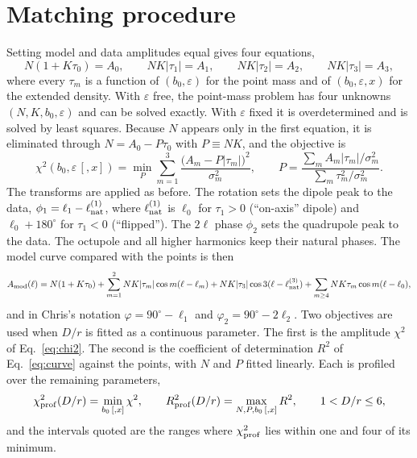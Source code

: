 \documentclass[10pt]{article}
\begin{document}
\section{Matching procedure}
Setting model and data amplitudes equal gives four equations,
\begin{equation}
N(1+K\tau_0)=A_0,\qquad NK|\tau_1|=A_1,\qquad NK|\tau_2|=A_2,\qquad NK|\tau_3|=A_3,
\label{eq:match}
\end{equation}
where every $\tau_m$ is a function of $(b_0,\varepsilon)$ for the point mass and of $(b_0,\varepsilon,x)$ for the extended density. With $\varepsilon$ free, the point-mass problem has four unknowns $(N,K,b_0,\varepsilon)$ and can be solved exactly. With $\varepsilon$ fixed it is overdetermined and is solved by least squares. Because $N$ appears only in the first equation, it is eliminated through $N=A_0-P\tau_0$ with $P\equiv NK$, and the objective is
\begin{equation}
\chi^2(b_0,\varepsilon\,[,x])=\min_P\sum_{m=1}^{3}\frac{\big(A_m-P|\tau_m|\big)^2}{\sigma_m^2},\qquad
P=\frac{\sum_m A_m|\tau_m|/\sigma_m^2}{\sum_m\tau_m^2/\sigma_m^2}.
\label{eq:chi2}
\end{equation}
The transforms are applied as before. The rotation sets the dipole peak to the data, $\phi_1=\ell_1-\ell^{(1)}_{\rm nat}$, where $\ell^{(1)}_{\rm nat}$ is $\ell_0$ for $\tau_1>0$ (``on-axis'' dipole) and $\ell_0+180^\circ$ for $\tau_1<0$ (``flipped''). The $2\ell$ phase $\phi_2$ sets the quadrupole peak to the data. The octupole and all higher harmonics keep their natural phases. The model curve compared with the points is then
\begin{equation}
A_{\rm mod}(\ell)=N(1+K\tau_0)+\sum_{m=1}^{2}NK|\tau_m|\cos m(\ell-\ell_m)+NK|\tau_3|\cos 3(\ell-\ell^{(3)}_{\rm nat})+\sum_{m\ge4}NK\tau_m\cos m(\ell-\ell_0),
\label{eq:curve}
\end{equation}
and in Chris's notation $\varphi=90^\circ-\ell_1$ and $\varphi_2=90^\circ-2\ell_2$. Two objectives are used when $D/r$ is fitted as a continuous parameter. The first is the amplitude $\chi^2$ of Eq.~\eqref{eq:chi2}. The second is the coefficient of determination $R^2$ of Eq.~\eqref{eq:curve} against the points, with $N$ and $P$ fitted linearly. Each is profiled over the remaining parameters,
\begin{equation}
\chi^2_{\rm prof}(D/r)=\min_{b_0\,[,x]}\chi^2,\qquad R^2_{\rm prof}(D/r)=\max_{N,P,b_0\,[,x]}R^2,\qquad 1<D/r\le6,
\label{eq:profile}
\end{equation}
and the intervals quoted are the ranges where $\chi^2_{\rm prof}$ lies within one and four of its minimum.
\end{document}
